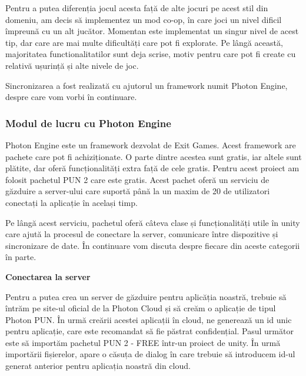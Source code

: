 \documentclass[12pt, a4paper]{article}
\begin{document}
	Pentru a putea diferenția jocul acesta față de alte jocuri pe acest stil din domeniu, am decis să implementez un mod co-op, în care joci un nivel dificil împreună cu un alt jucător. Momentan este implementat un singur nivel de acest tip, dar care are mai multe dificultăți care pot fi explorate. Pe lângă această, majoritatea functionalitatilor sunt deja scrise, motiv pentru care pot fi create cu relativă ușurință și alte nivele de joc.
	\newline
	
	Sincronizarea a fost realizată cu ajutorul un framework numit Photon Engine, despre care vom vorbi în continuare.
	
	
	
	
	
	\subsubsection{Modul de lucru cu Photon Engine}
	
	Photon Engine este un framework dezvolat de Exit Games. Acest framework are pachete care pot fi achiziționate. O parte dintre acestea sunt gratis, iar altele sunt plătite, dar oferă funcționalități extra față de cele gratis. Pentru acest proiect am folosit pachetul PUN 2 care este gratis. Acest pachet oferă un serviciu de găzduire a server-ului care suportă până la un maxim de 20 de utilizatori conectați la aplicație în același timp.
	\newline
	
	Pe lângă acest serviciu, pachetul oferă câteva clase și funcționalități utile în unity care ajută la procesul de conectare la server, comunicare între dispozitive și sincronizare de date. În continuare vom discuta despre fiecare din aceste categorii în parte.
	\newline
	
	
	
	
	
	\textbf{Conectarea la server}
	\newline
	
	Pentru a putea crea un server de găzduire pentru aplicăția noastră, trebuie să întrăm pe site-ul oficial de la Photon Cloud și să creăm o aplicație de tipul Photon PUN. În urmă creării acestei aplicații în cloud, ne generează un id unic pentru aplicație, care este recomandat să fie păstrat confidențial. Pasul următor este să importăm pachetul PUN 2 - FREE într-un proiect de unity. În urmă importării fișierelor, apare o căsuța de dialog în care trebuie să introducem id-ul generat anterior pentru aplicația noastră din cloud.
	\newline
	
\end{document}
